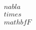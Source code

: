 \documentclass[preview]{standalone}
\begin{document}
\begin{align*}
\quad\\nabla \quad\\times \quad\\mathbf{F}
\end{align*}
\end{document}

